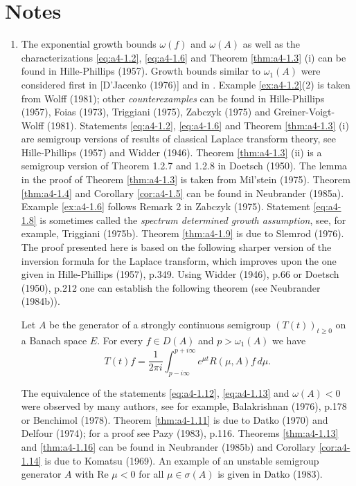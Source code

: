 \section*{Notes}
\begin{enumerate}[label=\emph{Section \arabic*:}, wide]

\item The exponential growth bounds $\omega(f)$ and $\omega(A)$ as well as the characterizations \eqref{eq:a4-1.2}, \eqref{eq:a4-1.6} and Theorem \ref{thm:a4-1.3} (i) can be found in Hille-Phillips (1957).
Growth bounds similar to $\omega_{1}(A)$ were considered first in [D'Jacenko (1976)] and in \citet[Prop.2]{zabczyk:1979}. 
Example \ref{ex:a4-1.2}(2) is taken from Wolff (1981); other \emph{counterexamples} can be found in Hille-Phillips (1957), Foias (1973), Triggiani (1975), Zabczyk (1975) and Greiner-Voigt-Wolff (1981). 
Statements \eqref{eq:a4-1.2}, \eqref{eq:a4-1.6} and Theorem \ref{thm:a4-1.3} (i) are semigroup versions of results of classical Laplace transform theory, see Hille-Phillips (1957) and Widder (1946). 
Theorem \ref{thm:a4-1.3} (ii) is a semigroup version of Theorem 1.2.7 and 1.2.8 in Doetsch (1950). 
The lemma in the proof of Theorem \ref{thm:a4-1.3} is taken from Mil'stein (1975). 
Theorem \ref{thm:a4-1.4} and Corollary \ref{cor:a4-1.5} can be found in Neubrander (1985a). 
Example \ref{ex:a4-1.6} follows Remark 2 in Zabczyk (1975). 
Statement \eqref{eq:a4-1.8} is sometimes called the \emph{spectrum determined growth assumption}, see, for example, Triggiani (1975b). 
Theorem \ref{thm:a4-1.9} is due to Slemrod (1976). 
The proof presented here is based on the following sharper version of the inversion formula for the Laplace transform, which improves upon the one given in Hille-Phillips (1957), p.349. 
Using Widder (1946), p.66 or Doetsch (1950), p.212 one can establish the following theorem (see Neubrander (1984b)).

\begin{theorem}\label{thm:a4-2.6}
Let $A$ be the generator of a strongly continuous semigroup $(T(t))_{t \geq 0}$ on a Banach space $E$. 
For every $f \in D(A)$ and $p > \omega_{1}(A)$ we have
\[
T(t)f = \frac{1}{2\pi i} \int_{p-i\infty}^{p+i\infty} e^{\mu t}R(\mu,A)f \, d\mu.
\]
\end{theorem}
\noindent
The equivalence of the statements \eqref{eq:a4-1.12}, \eqref{eq:a4-1.13} and \emph{$\omega(A) < 0$} were observed by many authors, see for example, Balakrishnan (1976), p.178 or Benchimol (1978).
Theorem \ref{thm:a4-1.11} is due to Datko (1970) and Delfour (1974); for a proof see Pazy (1983), p.116. 
Theorems \ref{thm:a4-1.13} and \ref{thm:a4-1.16} can be found in Neubrander (1985b) and Corollary \ref{cor:a4-1.14} is due to Komatsu (1969). 
An example of an unstable semigroup generator $A$ with Re $\mu < 0$ for all $\mu \in \sigma(A)$ is given in Datko (1983).


\end{enumerate}
